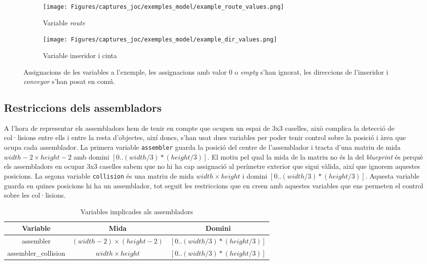 \begin{figure}[h]
    \centering
    \begin{subfigure}{0.45\textwidth}
        \texttt{[image: Figures/captures\_joc/exemples\_model/example\_route\_values.png]}
        \caption{Variable \textit{route}}
    \end{subfigure}
    \hfill
    \begin{subfigure}{0.45\textwidth}
        \texttt{[image: Figures/captures\_joc/exemples\_model/example\_dir\_values.png]}
        \caption{Variable inseridor i cinta}
    \end{subfigure}
    \caption{Assignacions de les variables a l'exemple, les assignacions amb valor 0 o \textit{empty} s'han ignorat, les direccions de l'inseridor i \textit{conveyor} s'han posat en comú.}
\end{figure}



\subsection{Restriccions dels assembladors}
A l'hora de representar els assembladors hem de tenir en compte que ocupen un espai de 3x3 caselles, això complica la detecció de col·lisions entre ells i entre la resta d'objectes, així doncs, s'han usat dues variables per poder tenir control sobre la posició i àrea que ocupa cada assemblador. La primera variable \texttt{assembler} guarda la posició del centre de l'assemblador i tracta d'una matriu de mida $width-2 \times height-2$ amb domini $[0..(width/3)*(height/3)]$. El motiu pel qual la mida de la matriu no és la del \textit{blueprint} és perquè els assembladors en ocupar 3x3 caselles sabem que no hi ha cap assignació al perímetre exterior que sigui vàlida, així que ignorem aquestes posicions. La segona variable \texttt{collision} és una matriu de mida $width \times height$ i domini $[0..(width/3)*(height/3)]$. Aquesta variable guarda en quines posicions hi ha un assemblador, tot seguit les restriccions que en creen amb aquestes variables que ens permeten el control sobre les col·lisions.

\begin{table}[h]
    \centering
    \begin{tabular}{|c|c|c|}
    \hline
    \textbf{Variable} & \textbf{Mida} & \textbf{Domini} \\
    \hline
    assembler & $(width-2) \times (height-2)$ & $[0..(width/3)*(height/3)]$ \\
    \hline
    assembler\_collision & $width \times height$ & $[0..(width/3)*(height/3)]$ \\
    \hline
    \end{tabular}
    \caption{Variables implicades als assembladors}
    \label{assembler-variables}
\end{table}

